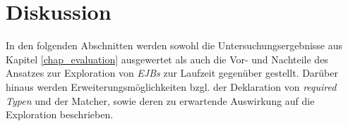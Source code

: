 \chapter{Diskussion}
In den folgenden Abschnitten werden sowohl die Untersuchungsergebnisse aus Kapitel \ref{chap_evaluation} ausgewertet als auch die Vor- und Nachteile des Ansatzes zur Exploration von \emph{EJBs} zur Laufzeit gegenüber gestellt. Darüber hinaus werden Erweiterungsmöglichkeiten bzgl. der Deklaration von \emph{required Typen} und der Matcher, sowie deren zu erwartende Auswirkung auf die Exploration beschrieben.


 